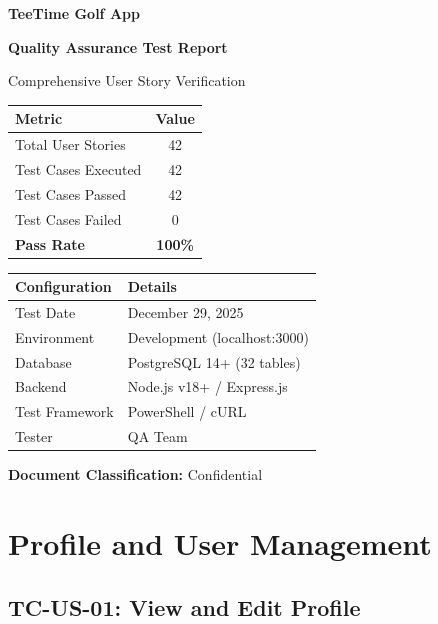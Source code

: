 \documentclass[11pt,a4paper]{article}
\begin{document}
\begin{titlepage}
\centering
\vspace*{1cm}
{\Huge\bfseries\color{primary} TeeTime Golf App\par}
\vspace{0.5cm}
{\LARGE\bfseries Quality Assurance Test Report\par}
\vspace{0.3cm}
{\large Comprehensive User Story Verification\par}
\vspace{2cm}

\begin{tabular}{|l|c|}
\hline
\rowcolor{lightgray}
\textbf{Metric} & \textbf{Value} \\
\hline
Total User Stories & 42 \\
Test Cases Executed & 42 \\
Test Cases Passed & 42 \\
Test Cases Failed & 0 \\
\textbf{Pass Rate} & \textbf{100\%} \\
\hline
\end{tabular}

\vspace{1.5cm}

\begin{tabular}{|l|l|}
\hline
\rowcolor{lightgray}
\textbf{Configuration} & \textbf{Details} \\
\hline
Test Date & December 29, 2025 \\
Environment & Development (localhost:3000) \\
Database & PostgreSQL 14+ (32 tables) \\
Backend & Node.js v18+ / Express.js \\
Test Framework & PowerShell / cURL \\
Tester & QA Team \\
\hline
\end{tabular}

\vfill
{\large\textbf{Document Classification:} Confidential\par}
\end{titlepage}

\tableofcontents
\newpage


\section{Profile and User Management}

\subsection{TC-US-01: View and Edit Profile}
\end{document}
